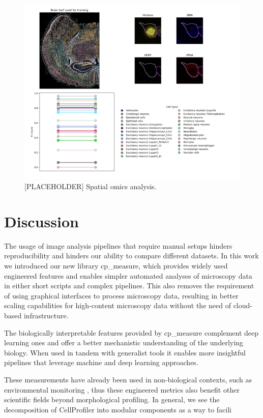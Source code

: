 \documentclass{article}
\begin{document}
\begin{figure}[htbp]
\centering
\includegraphics[width=.9\linewidth]{./figs/spatial.png}
\caption{\label{fig:spatial_omics}{[}PLACEHOLDER] Spatial omics analysis.}
\end{figure}
\section{Discussion}
\label{sec:org3adb4ba}
The usage of image analysis pipelines that require manual setups hinders reproducibility and hinders our ability to compare different datasets. In this work we introduced our new library cp\_measure, which provides widely used engineered features and enables simpler automated analyses of microscopy data in either short scripts and complex pipelines. This also removes the requirement of using graphical interfaces to process microscopy data, resulting in better scaling capabilities for high-content microscopy data without the need of cloud-based infrastructure.

The biologically interpretable features provided by cp\_measure complement deep learning ones and offer a better mechanistic understanding of the underlying biology. When used in tandem with generalist tools it enables more insightful pipelines that leverage machine and deep learning approaches. 

These measurements have already been used in non-biological contexts, such as environmental monitoring \citep{ideharaExploringNileRed2025}, thus these engineered metrics also benefit other scientific fields beyond morphological profiling. In general, we see the decomposition of CellProfiler into modular components as a way to facili
\end{document}
